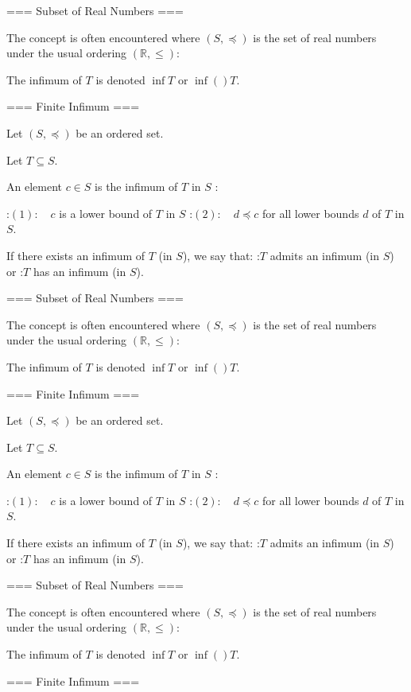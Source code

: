 === Subset of Real Numbers ===

The concept is often encountered where $\left( S, \preccurlyeq \right)$ is the set of real numbers under the usual ordering $\left( \mathbb R, \le \right)$:



The infimum of $T$ is denoted $\inf T$ or $\inf \left(   \right)T$.


=== Finite Infimum ===

Let $\left( S, \preccurlyeq \right)$ be an ordered set.

Let $T \subseteq S$.


An element $c \in S$ is the infimum of $T$ in $S$ :

:$(1): \quad c$ is a lower bound of $T$ in $S$
:$(2): \quad d \preccurlyeq c$ for all lower bounds $d$ of $T$ in $S$.


If there exists an infimum of $T$ (in $S$), we say that:
:$T$ admits an infimum (in $S$) or
:$T$ has an infimum (in $S$).


=== Subset of Real Numbers ===

The concept is often encountered where $\left( S, \preccurlyeq \right)$ is the set of real numbers under the usual ordering $\left( \mathbb R, \le \right)$:



The infimum of $T$ is denoted $\inf T$ or $\inf \left(   \right)T$.


=== Finite Infimum ===

Let $\left( S, \preccurlyeq \right)$ be an ordered set.

Let $T \subseteq S$.


An element $c \in S$ is the infimum of $T$ in $S$ :

:$(1): \quad c$ is a lower bound of $T$ in $S$
:$(2): \quad d \preccurlyeq c$ for all lower bounds $d$ of $T$ in $S$.


If there exists an infimum of $T$ (in $S$), we say that:
:$T$ admits an infimum (in $S$) or
:$T$ has an infimum (in $S$).


=== Subset of Real Numbers ===

The concept is often encountered where $\left( S, \preccurlyeq \right)$ is the set of real numbers under the usual ordering $\left( \mathbb R, \le \right)$:



The infimum of $T$ is denoted $\inf T$ or $\inf \left(   \right)T$.


=== Finite Infimum ===


